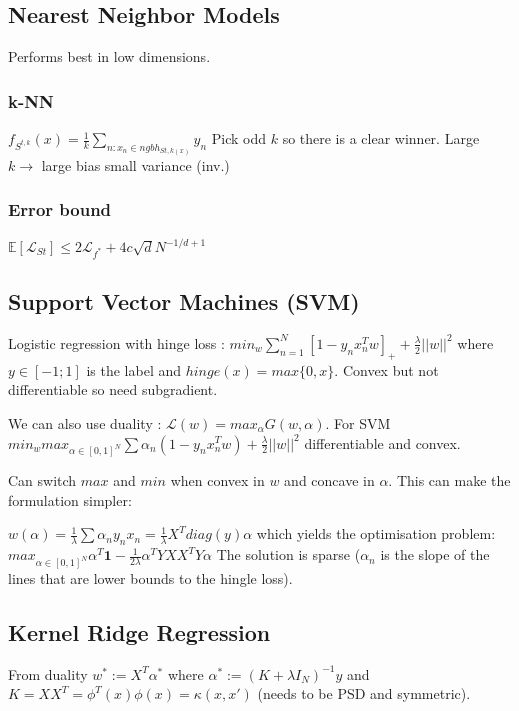 \subsection{Nearest Neighbor Models}
Performs best in low dimensions. 
\subsubsection{k-NN}
$f_{S^{t,k}}(x) = \frac{1}{k} \sum_{n:x_n\in ngbh_{S{t,k}(x)}} y_n$
Pick odd $k$ so there is a clear winner.
Large $k \rightarrow$ large bias small variance (inv.)

\subsubsection{Error bound}
$\mathbb{E}[\mathcal{L}_{St}] \le 2 \mathcal{L}_{f^*} + 4 c \sqrt{d} N^{-1/d+1}$

\subsection{Support Vector Machines (SVM)}
Logistic regression with hinge loss :
$min_w \sum_{n=1}^N [1-y_n x_n^T w]_+ + \frac{\lambda}{2} ||w||^2$ where $y \in [-1;1]$ is the label and $hinge(x)= max\{0,x\}$. Convex but not differentiable so need subgradient.

We can also use duality : $\mathcal{L}(w) = max_{\alpha} G(w, \alpha)$. For SVM
$min_{w} max_{\alpha \in [0,1]^N} \sum \alpha_n (1 - y_nx_n^Tw) + \frac{\lambda}{2} ||w||^2$ differentiable and convex.

Can switch $max$ and $min$ when convex in $w$ and concave in $\alpha$. This can make the formulation simpler:

$w(\alpha) = \frac{1}{\lambda} \sum \alpha_n y_n x_n = \frac{1}{\lambda} X^T diag(y) \alpha$ which yields the optimisation problem:
$max_{\alpha \in [0,1]^N} \alpha^T\mathbf{1} - \frac{1}{2\lambda} \alpha^T Y X X^T Y \alpha$
The solution is sparse ($\alpha_n$ is the slope of the lines that are lower bounds to the hingle loss).

\subsection{Kernel Ridge Regression}
From duality $w^* := X^T \alpha^*$ where $\alpha^* := (K + \lambda I_N)^{-1}y$ and $K=XX^T = \phi^T(x) \phi(x) = \kappa(x,x')$ (needs to be PSD and symmetric).



